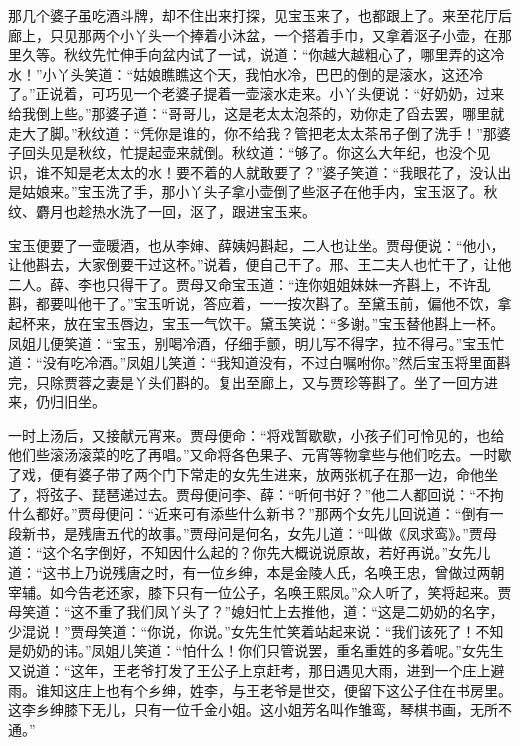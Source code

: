 \documentclass[12pt,oneside]{book}
\begin{document}
那几个婆子虽吃酒斗牌，却不住出来打探，见宝玉来了，也都跟上了。来至花厅后廊上，只见那两个小丫头一个捧着小沐盆，一个搭着手巾，又拿着沤子小壶，在那里久等。秋纹先忙伸手向盆内试了一试，说道：“你越大越粗心了，哪里弄的这冷水！”小丫头笑道：“姑娘瞧瞧这个天，我怕水冷，巴巴的倒的是滚水，这还冷了。”正说着，可巧见一个老婆子提着一壶滚水走来。小丫头便说：“好奶奶，过来给我倒上些。”那婆子道：“哥哥儿，这是老太太泡茶的，劝你走了舀去罢，哪里就走大了脚。”秋纹道：“凭你是谁的，你不给我？管把老太太茶吊子倒了洗手！”那婆子回头见是秋纹，忙提起壶来就倒。秋纹道：“够了。你这么大年纪，也没个见识，谁不知是老太太的水！要不着的人就敢要了？”婆子笑道：“我眼花了，没认出是姑娘来。”宝玉洗了手，那小丫头子拿小壶倒了些沤子在他手内，宝玉沤了。秋纹、麝月也趁热水洗了一回，沤了，跟进宝玉来。

宝玉便要了一壶暖酒，也从李婶、薛姨妈斟起，二人也让坐。贾母便说：“他小，让他斟去，大家倒要干过这杯。”说着，便自己干了。邢、王二夫人也忙干了，让他二人。薛、李也只得干了。贾母又命宝玉道：“连你姐姐妹妹一齐斟上，不许乱斟，都要叫他干了。”宝玉听说，答应着，一一按次斟了。至黛玉前，偏他不饮，拿起杯来，放在宝玉唇边，宝玉一气饮干。黛玉笑说：“多谢。”宝玉替他斟上一杯。凤姐儿便笑道：“宝玉，别喝冷酒，仔细手颤，明儿写不得字，拉不得弓。”宝玉忙道：“没有吃冷酒。”凤姐儿笑道：“我知道没有，不过白嘱咐你。”然后宝玉将里面斟完，只除贾蓉之妻是丫头们斟的。复出至廊上，又与贾珍等斟了。坐了一回方进来，仍归旧坐。

一时上汤后，又接献元宵来。贾母便命：“将戏暂歇歇，小孩子们可怜见的，也给他们些滚汤滚菜的吃了再唱。”又命将各色果子、元宵等物拿些与他们吃去。一时歇了戏，便有婆子带了两个门下常走的女先生进来，放两张杌子在那一边，命他坐了，将弦子、琵琶递过去。贾母便问李、薛：“听何书好？”他二人都回说：“不拘什么都好。”贾母便问：“近来可有添些什么新书？”那两个女先儿回说道：“倒有一段新书，是残唐五代的故事。”贾母问是何名，女先儿道：“叫做《凤求鸾》。”贾母道：“这个名字倒好，不知因什么起的？你先大概说说原故，若好再说。”女先儿道：“这书上乃说残唐之时，有一位乡绅，本是金陵人氏，名唤王忠，曾做过两朝宰辅。如今告老还家，膝下只有一位公子，名唤王熙凤。”众人听了，笑将起来。贾母笑道：“这不重了我们凤丫头了？”媳妇忙上去推他，道：“这是二奶奶的名字，少混说！”贾母笑道：“你说，你说。”女先生忙笑着站起来说：“我们该死了！不知是奶奶的讳。”凤姐儿笑道：“怕什么！你们只管说罢，重名重姓的多着呢。”女先生又说道：“这年，王老爷打发了王公子上京赶考，那日遇见大雨，进到一个庄上避雨。谁知这庄上也有个乡绅，姓李，与王老爷是世交，便留下这公子住在书房里。这李乡绅膝下无儿，只有一位千金小姐。这小姐芳名叫作雏鸾，琴棋书画，无所不通。”
\end{document}

